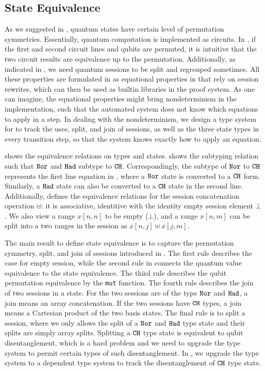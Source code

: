 \subsection{State Equivalence}

As we suggested in , quantum states have certain level of permutation symmetries. Essentially, quantum computation is implemented as circuits. In , if the first and second circuit lines and qubits are permuted, it is intuitive that the two circuit results are equivalence up to the permutation. Additionally, as indicated in , we need quantum sessions to be split and regrouped sometimes. All these properties are formulated in \qafny as equational properties in  that rely on session rewrites, which can then be used as builtin libraries in the proof system. As one can imagine, the equational properties might bring nondeterminism in the \qafny implementation, such that the automated system does not know which equations to apply in a step. In dealing with the nondeterminism, we design a type system for \qafny to track the uses, split, and join of sessions, as well as the three state types in every transition step, so that the system knows exactly how to apply an equation.

 shows the equivalence relations on types and states.
 shows the subtyping relation such that $\texttt{Nor}$ and $\texttt{Had}$ subtype to $\texttt{CH}$.
Correspondingly, the subtype of $\texttt{Nor}$ to $\texttt{CH}$ represents the first line equation in , where a $\texttt{Nor}$ state is converted to a $\texttt{CH}$ form. Similarly, a $\texttt{Had}$ state can also be converted to a $\texttt{CH}$ state in the second line.
Additionally,  defines the equivalence relations for the session concatenation operation $\uplus$: it is associative, identitive with the identity empty session element $\bot$.
We also view a range $x[n,n]$ to be empty ($\bot$), and a range $x[n,m]$ can be split into a two ranges in the session as $x[n,j] \uplus x[j,m]$. 

The main result to define state equivalence is to capture the permutation symmetry, split, and join of sessions introduced in . The first rule describes the case for empty session, while the second rule in  connects the quantum value equivalence to the state equivalence.
The third rule describes the qubit permutation equivalence by the \texttt{mut} function.
The fourth rule describes the join of two sessions in a state.
For the two sessions are of the type $\texttt{Nor}$ and $\texttt{Had}$, a join means an array concatenation.
If the two sessions have $\texttt{CH}$ types, a join means a Cartesian product of the two basis states.
The final rule is to split a session, where we only allows the split of a $\texttt{Nor}$ and $\texttt{Had}$ type state and their splits are simply array splits. Splitting a $\texttt{CH}$ type state is equivalent to qubit disentanglement, which is a hard problem and we need to upgrade the type system to permit certain types of such disentanglement. In , we upgrade the \qafny type system to a dependent type system to track the disentanglement of $\texttt{CH}$ type state.

